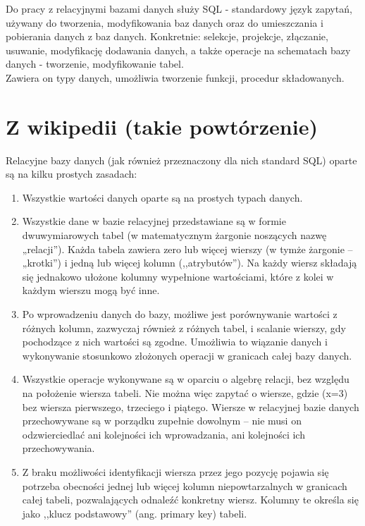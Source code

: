 \documentclass[]{report}
\begin{document}
Do pracy z relacyjnymi bazami danych służy SQL - standardowy język zapytań, używany do tworzenia, modyfikowania baz danych oraz do umieszczania i pobierania danych z baz danych.
Konkretnie: selekcje, projekcje, złączanie, usuwanie, modyfikację dodawania danych, a także operacje na schematach bazy danych - tworzenie, modyfikowanie tabel. \\
Zawiera on typy danych, umożliwia tworzenie funkcji, procedur składowanych.


\section{Z wikipedii (takie powtórzenie)}
Relacyjne bazy danych (jak również przeznaczony dla nich standard SQL) oparte są na kilku prostych zasadach:

\begin{enumerate}
\item Wszystkie wartości danych oparte są na prostych typach danych.
\item Wszystkie dane w bazie relacyjnej przedstawiane są w formie dwuwymiarowych tabel (w matematycznym żargonie noszących nazwę „relacji”). Każda tabela zawiera zero lub więcej wierszy (w tymże żargonie – „krotki”) i jedną lub więcej kolumn (,,atrybutów''). Na każdy wiersz składają się jednakowo ułożone kolumny wypełnione wartościami, które z kolei w każdym wierszu mogą być inne.
\item Po wprowadzeniu danych do bazy, możliwe jest porównywanie wartości z różnych kolumn, zazwyczaj również z różnych tabel, i scalanie wierszy, gdy pochodzące z nich wartości są zgodne. Umożliwia to wiązanie danych i wykonywanie stosunkowo złożonych operacji w granicach całej bazy danych.
\item Wszystkie operacje wykonywane są w oparciu o algebrę relacji, bez względu na położenie wiersza tabeli. Nie można więc zapytać o wiersze, gdzie (x=3) bez wiersza pierwszego, trzeciego i piątego. Wiersze w relacyjnej bazie danych przechowywane są w porządku zupełnie dowolnym – nie musi on odzwierciedlać ani kolejności ich wprowadzania, ani kolejności ich przechowywania.
\item Z braku możliwości identyfikacji wiersza przez jego pozycję pojawia się potrzeba obecności jednej lub więcej kolumn niepowtarzalnych w granicach całej tabeli, pozwalających odnaleźć konkretny wiersz. Kolumny te określa się jako ,,klucz podstawowy'' (ang. primary key) tabeli.
\end{enumerate}
\end{document}
